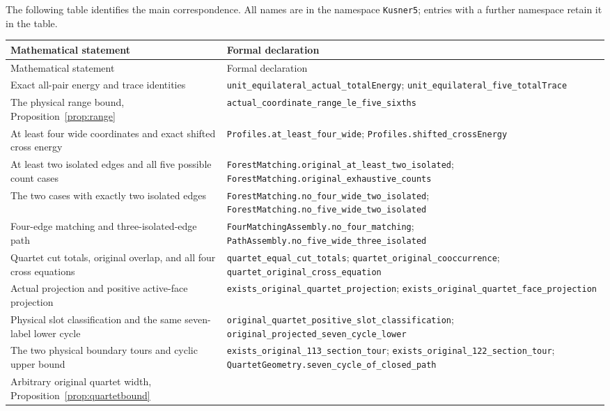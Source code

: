 \documentclass[11pt]{article}
\theoremstyle{definition}
\theoremstyle{remark}
\newcommand{\lean}[1]{\nolinkurl{#1}}
\begin{document}
The following table identifies the main correspondence. All names are
in the namespace \lean{Kusner5}; entries with a further namespace retain
it in the table.
\begingroup\small
\setlength{\tabcolsep}{4pt}
\begin{longtable}{>{\raggedright\arraybackslash}p{}>{\raggedright\arraybackslash}p{}}
\toprule
Mathematical statement & Formal declaration\\
\midrule
\endfirsthead
\toprule
Mathematical statement & Formal declaration\\
\midrule
\endhead
\bottomrule
\endfoot
Exact all-pair energy and trace identities &
\lean{unit_equilateral_actual_totalEnergy};
\lean{unit_equilateral_five_totalTrace}\\[3pt]
The physical range bound, Proposition~\ref{prop:range} &
\lean{actual_coordinate_range_le_five_sixths}\\[3pt]
At least four wide coordinates and exact shifted cross energy &
\lean{Profiles.at_least_four_wide};
\lean{Profiles.shifted_crossEnergy}\\[3pt]
At least two isolated edges and all five possible count cases &
\lean{ForestMatching.original_at_least_two_isolated};
\lean{ForestMatching.original_exhaustive_counts}\\[3pt]
The two cases with exactly two isolated edges &
\lean{ForestMatching.no_four_wide_two_isolated};
\lean{ForestMatching.no_five_wide_two_isolated}\\[3pt]
Four-edge matching and three-isolated-edge path &
\lean{FourMatchingAssembly.no_four_matching};
\lean{PathAssembly.no_five_wide_three_isolated}\\[3pt]
Quartet cut totals, original overlap, and all four cross equations &
\lean{quartet_equal_cut_totals};
\lean{quartet_original_cooccurrence};
\lean{quartet_original_cross_equation}\\[3pt]
Actual projection and positive active-face projection &
\lean{exists_original_quartet_projection};
\lean{exists_original_quartet_face_projection}\\[3pt]
Physical slot classification and the same seven-label lower cycle &
\lean{original_quartet_positive_slot_classification};
\lean{original_projected_seven_cycle_lower}\\[3pt]
The two physical boundary tours and cyclic upper bound &
\lean{exists_original_113_section_tour};
\lean{exists_original_122_section_tour};
\lean{QuartetGeometry.seven_cycle_of_closed_path}\\[3pt]
Arbitrary original quartet width, Proposition~\ref{prop:quartetbound} &

\end{longtable}
\end{document}
